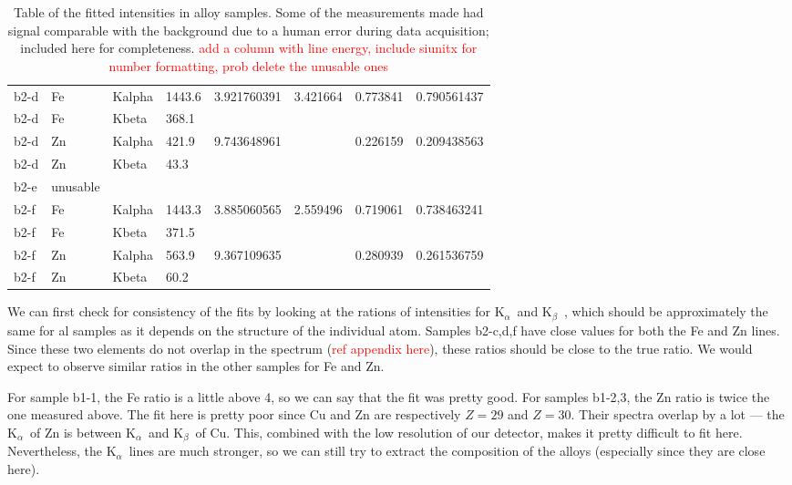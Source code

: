 \documentclass[11pt,a4paper,twoside,onecolumn]{article}
\newcommand{\reminder}[1]{\textcolor{red}{#1}}
\newcommand{\Kalpha}{$\mathrm{K}_\alpha$~}
\newcommand{\Kbeta}{$\mathrm{K}_\beta$~}
\begin{document}
\begin{table}[htbp]
\begin{tabular}{@{}llllllll@{}}
b2-d   & Fe       & Kalpha & 1443.6    & 3.921760391 & 3.421664 & 0.773841 & 0.790561437 \\
b2-d   & Fe       & Kbeta  & 368.1     &             &          &          &             \\
b2-d   & Zn       & Kalpha & 421.9     & 9.743648961 &          & 0.226159 & 0.209438563 \\
b2-d   & Zn       & Kbeta  & 43.3      &             &          &          &             \\ \midrule
b2-e   & unusable &        &           &             &          &          &             \\ \midrule
b2-f   & Fe       & Kalpha & 1443.3    & 3.885060565 & 2.559496 & 0.719061 & 0.738463241 \\
b2-f   & Fe       & Kbeta  & 371.5     &             &          &          &             \\
b2-f   & Zn       & Kalpha & 563.9     & 9.367109635 &          & 0.280939 & 0.261536759 \\
b2-f   & Zn       & Kbeta  & 60.2      &             &          &          &             \\ \bottomrule
\end{tabular}
\caption{Table of the fitted intensities in alloy samples. Some of the measurements made had signal comparable with the background due to a human error during data acquisition; included here for completeness. \reminder{add a column with line energy, include siunitx for number formatting, prob delete the unusable ones}}
\label{tab:unlabelled-alloys}
\end{table}

We can first check for consistency of the fits by looking at the rations of intensities for \Kalpha and \Kbeta, which should be approximately the same for al samples as it depends on the structure of the individual atom. Samples b2-c,d,f have close values for both the Fe and Zn lines. Since these two elements do not overlap in the spectrum (\reminder{ref appendix here}), these ratios should be close to the true ratio. We would expect to observe similar ratios in the other samples for Fe and Zn.

For sample b1-1, the Fe ratio is a little above 4, so we can say that the fit was pretty good. For samples b1-2,3, the Zn ratio is twice the one measured above. The fit here is pretty poor since Cu and Zn are respectively $Z=29$ and $Z=30$. Their spectra overlap by a lot --- the \Kalpha of Zn is between \Kalpha and \Kbeta of Cu. This, combined with the low resolution of our detector, makes it pretty difficult to fit here. Nevertheless, the \Kalpha lines are much stronger, so we can still try to extract the composition of the alloys (especially since they are close here).
\end{document}
